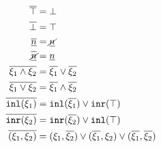 \begin{subequations}\label{defn:dual}
\begin{align*}
  \cdual{\ctruth} &= \cfalsity \\
  \cdual{\cfalsity} &= \ctruth \\
  \cdual{\cnum{n}} &= \cnotnum{n} \\
  \cdual{\cnotnum{n}} &= \cnum{n} \\
  \cdual{\cand{\xi_1}{\xi_2}} &= \cor{\cdual{\xi_1}}{\cdual{\xi_2}} \\
  \cdual{\cor{\xi_1}{\xi_2}} &= \cand{\cdual{\xi_1}}{\cdual{\xi_2}} \\
  \cdual{\cinl{\xi_1}} &= \cor{ \cinl{\cdual{\xi_1}} }{ \cinr{\ctruth} } \\
  \cdual{\cinr{\xi_2}} &= \cor{ \cinr{\cdual{\xi_2}} }{ \cinl{\ctruth} } \\
  \cdual{\cpair{\xi_1}{\xi_2}} &=
  \cor{ \cor{ 
    \cpair{\xi_1}{\cdual{\xi_2}}
  }{
    \cpair{\cdual{\xi_1}}{\xi_2}
  }}{
    \cpair{\cdual{\xi_1}}{\cdual{\xi_2}}
  }
\end{align*}
\end{subequations}


